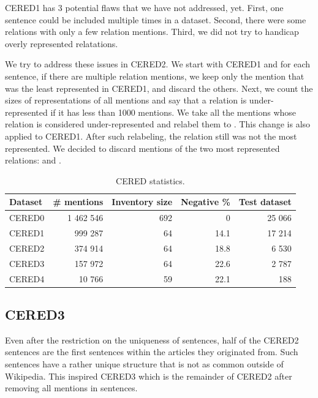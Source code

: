 CERED1 has 3 potential flaws that we have not addressed, yet. First, one sentence could be included multiple times in a dataset. Second, there were some relations with only a few relation mentions. Third, we did not try to handicap overly represented relatations. 

We try to address these issues in CERED2. We start with CERED1 and for each sentence, if there are multiple relation mentions, we keep only the mention that was the least represented in CERED1, and discard the others. Next, we count the sizes of representations of all mentions and say that a relation is under-represented if it has less than 1000 mentions. We take all the mentions whose relation is considered under-represented and relabel them to . This change is also applied to CERED1. After such relabeling, the  relation still was not the most represented. We decided to discard mentions of the two most represented relations:  and .

\begin{table}

\caption{CERED statistics.}

\label{table:CEREDsStatistics}

\begin{tabular}{p{} r r r r }

\hline
Dataset & \# mentions & Inventory size & Negative \% & Test dataset\\
\hline
\hline
CERED0 & 1 462 546 & 692 & 0 & 25 066\\
CERED1 & 999 287 & 64 & 14.1 & 17 214\\
CERED2 & 374 914 & 64 & 18.8 & 6 530\\
CERED3 & 157 972 & 64 & 22.6 & 2 787\\
CERED4 & 10 766 & 59 & 22.1 & 188\\
\hline


\end{tabular}

\end{table}






\subsection{CERED3}
Even after the restriction on the uniqueness of sentences, half of the CERED2 sentences are the first sentences within the articles they originated from. Such sentences have a rather unique structure that is not as common outside of Wikipedia. This inspired CERED3 which is the remainder of CERED2 after removing all mentions in  sentences.

